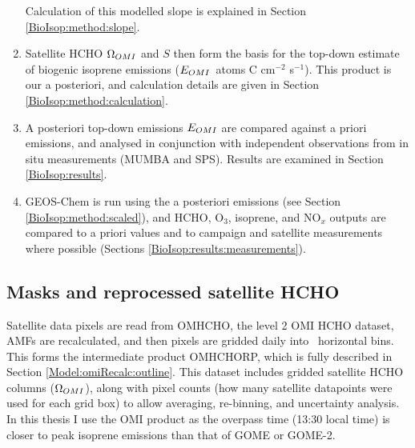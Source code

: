 \begin{enumerate}
        Calculation of this modelled slope is explained in Section \ref{BioIsop:method:slope}.
      \item 
        Satellite HCHO $\Omega_{OMI}$ and $S$ then form the basis for the top-down estimate of biogenic isoprene emissions ($E_{OMI}$~atoms C cm$^{-2}$ s$^{-1}$).
        This product is our a posteriori, and calculation details are given in Section \ref{BioIsop:method:calculation}.
      \item 
        A posteriori top-down emissions $E_{OMI}$ are compared against a priori emissions, and analysed in conjunction with independent observations from in situ measurements (MUMBA and SPS).
        Results are examined in Section \ref{BioIsop:results}.
      \item 
        GEOS-Chem is run using the a posteriori emissions (see Section \ref{BioIsop:method:scaled}), and HCHO, O$_3$, isoprene, and NO$_x$ outputs are compared to a priori values and to campaign and satellite measurements where possible (Sections \ref{BioIsop:results:measurements}).
    \end{enumerate}
    
  
  \subsection{Masks and reprocessed satellite HCHO}
    
    Satellite data pixels are read from OMHCHO, the level 2 OMI HCHO dataset, AMFs are recalculated, and then pixels are gridded daily into \highhr ~horizontal bins. 
    This forms the intermediate product OMHCHORP, which is fully described in Section \ref{Model:omiRecalc:outline}.
    This dataset includes gridded satellite HCHO columns ($\Omega_{OMI}$), along with pixel counts (how many satellite datapoints were used for each grid box) to allow averaging, re-binning, and uncertainty analysis.
    In this thesis I use the OMI product 
    as the overpass time (13:30 local time) is closer to peak isoprene emissions than that of GOME or GOME-2. %
    
